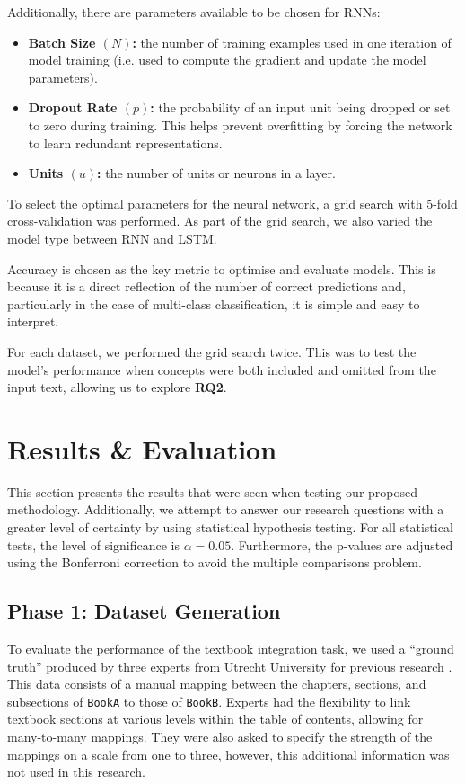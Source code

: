 \documentclass[twocolumn]{article}
\def\code#1{\texttt{#1}}
\def\bolditem#1{\item\textbf{#1:}}
\begin{document}
Additionally, there are parameters available to be chosen for RNNs:

\begin{itemize}
    \bolditem{Batch Size $(N)$} the number of training examples used in one iteration of model training (i.e. used to compute the gradient and update the model parameters).
    \bolditem{Dropout Rate $(p)$} the probability of an input unit being dropped or set to zero during training. This helps prevent overfitting by forcing the network to learn redundant representations.
    \bolditem{Units $(u)$} the number of units or neurons in a layer.
\end{itemize}

To select the optimal parameters for the neural network, a grid search with 5-fold cross-validation was performed. As part of the grid search, we also varied the model type between RNN and LSTM.

Accuracy is chosen as the key metric to optimise and evaluate models. This is because it is a direct reflection of the number of correct predictions and, particularly in the case of multi-class classification, it is simple and easy to interpret.

For each dataset, we performed the grid search twice. This was to test the model’s performance when concepts were both included and omitted from the input text, allowing us to explore \textbf{RQ2}.


\section{Results \& Evaluation} \label{sec:results}

This section presents the results that were seen when testing our proposed methodology. Additionally, we attempt to answer our research questions with a greater level of certainty by using statistical hypothesis testing. For all statistical tests, the level of significance is $\alpha=0.05$. Furthermore, the p-values are adjusted using the Bonferroni correction to avoid the multiple comparisons problem.

\subsection{Phase 1: Dataset Generation}\label{sec:results-stage-1}

To evaluate the performance of the textbook integration task, we used a ``ground truth'' produced by three experts from Utrecht University for previous research \cite{alpizarchacon2020}. This data consists of a manual mapping between the chapters, sections, and subsections of \code{BookA} to those of \code{BookB}. Experts had the flexibility to link textbook sections at various levels within the table of contents, allowing for many-to-many mappings. They were also asked to specify the strength of the mappings on a scale from one to three, however, this additional information was not used in this research. 
\end{document}
